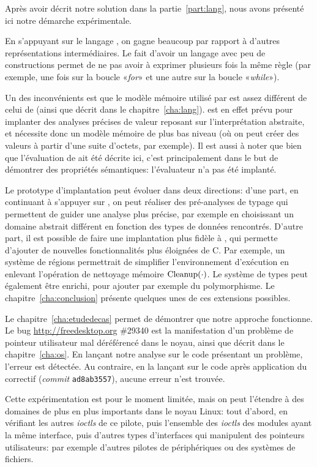 Après avoir décrit notre solution dans la partie~\ref{part:lang}, nous avons
présenté ici notre démarche expérimentale.

En s'appuyant sur le langage \newspeak, on gagne beaucoup par rapport à d'autres
représentations intermédiaires. Le fait d'avoir un langage avec peu de
constructions permet de ne pas avoir à exprimer plusieurs fois la même règle
(par exemple, une fois sur la boucle «\emph{for}» et une autre sur la boucle
«\emph{while}»).

Un des inconvénients est que le modèle mémoire utilisé par \newspeak est assez
différent de celui de \langname (ainsi que décrit dans le
chapitre~\ref{cha:lang}). \newspeak est en effet prévu pour implanter des
analyses précises de valeur reposant sur l'interprétation abstraite, et
nécessite donc un modèle mémoire de plus bas niveau (où on peut créer des
valeurs à partir d'une suite d'octets, par exemple). Il est aussi à noter que
bien que l'évaluation de \langname ait été décrite ici, c'est principalement
dans le but de démontrer des propriétés sémantiques: l'évaluateur n'a pas été
implanté.

Le prototype d'implantation peut évoluer dans deux directions: d'une part, en
continuant à s'appuyer sur \newspeak, on peut réaliser des pré-analyses de
typage qui permettent de guider une analyse plus précise, par exemple en
choisissant un domaine abstrait différent en fonction des types de données
rencontrés. D'autre part, il est possible de faire une implantation plus fidèle
à \langname, qui permette d'ajouter de nouvelles fonctionnalités plus éloignées
de C. Par exemple, un système de régions permettrait de simplifier
l'environnement d'exécution en enlevant l'opération de nettoyage mémoire
$\mathrm{Cleanup}(\cdot)$. Le système de types peut également être enrichi, pour ajouter
par exemple du polymorphisme. Le chapitre~\ref{cha:conclusion} présente quelques
unes de ces extensions possibles.

Le chapitre~\ref{cha:etudedecas} permet de démontrer que notre approche
fonctionne. Le bug \url{http://freedesktop.org} \#29340 est la manifestation
d'un problème de pointeur utilisateur mal déréférencé dans le noyau, ainsi que
décrit dans le chapitre~\ref{cha:os}. En lançant notre analyse sur le code
présentant un problème, l'erreur est détectée. Au contraire, en la lançant sur
le code après application du correctif (\emph{commit} \texttt{ad8ab3557}),
aucune erreur n'est trouvée.

Cette expérimentation est pour le moment limitée, mais on peut l'étendre à des
domaines de plus en plus importants dans le noyau Linux: tout d'abord, en
vérifiant les autres \emph{ioctls} de ce pilote, puis l'ensemble des
\emph{ioctls} des modules ayant la même interface, puis d'autres types
d'interfaces qui manipulent des pointeurs utilisateurs: par exemple d'autres
pilotes de périphériques ou des systèmes de fichiers.

